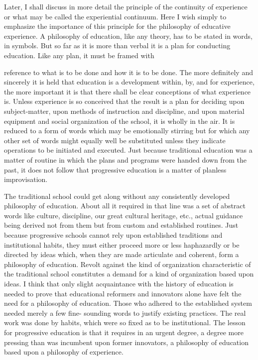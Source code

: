Later, I shall discuss in more detail the principle of the continuity of experience or 
what may be called the experiential continuum. Here I wish simply to emphasize the 
importance of this principle for the philosophy of educative experience. A philosophy of 
education, like any theory, has to be stated in words, in symbols. But so far as it is more 
than verbal it is a plan for conducting education. Like any plan, it must be framed with 



reference to what is to be done and how it is to be done. The more definitely and 
sincerely it is held that education is a development within, by, and for experience, the 
more important it is that there shall be clear conceptions of what experience is. Unless 
experience is so conceived that the result is a plan for deciding upon subject-matter, upon 
methods of instruction and discipline, and upon material equipment and social 
organization of the school, it is wholly in the air. It is reduced to a form of words which 
may be emotionally stirring but for which any other set of words might equally well be 
substituted unless they indicate operations to be initiated and executed. Just because 
traditional education was a matter of routine in which the plans and programs were 
handed down from the past, it does not follow that progressive education is a matter of 
planless improvisation. 

The traditional school could get along without any consistently developed philosophy 
of education. About all it required in that line was a set of abstract words like culture, 
discipline, our great cultural heritage, etc., actual guidance being derived not from them 
but from custom and established routines. Just because progressive schools cannot rely 
upon established traditions and institutional habits, they must either proceed more or less 
haphazardly or be directed by ideas which, when they are made articulate and coherent, 
form a philosophy of education. Revolt against the kind of organization characteristic of 
the traditional school constitutes a demand for a kind of organization based upon ideas. I 
think that only slight acquaintance with the history of education is needed to prove that 
educational reformers and innovators alone have felt the need for a philosophy of 
education. Those who adhered to the established system needed merely a few fine- 
sounding words to justify existing practices. The real work was done by habits, which 
were so fixed as to be institutional. The lesson for progressive education is that it requires 
in an urgent degree, a degree more pressing than was incumbent upon former innovators, 
a philosophy of education based upon a philosophy of experience. 

